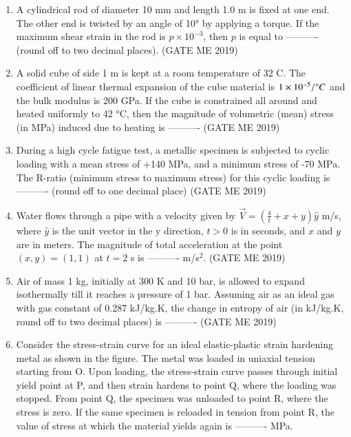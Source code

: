 \documentclass[journal]{IEEEtran}
\begin{document}
\begin{enumerate}
\item A cylindrical rod of diameter 10 mm and length 1.0 m is fixed at one end. The other end is twisted by an angle of 10° by applying a torque. If the maximum shear strain in the rod is $ p \times 10^{-3} $, then $ p $ is equal to ---------- (round off to two decimal places).
\hfill (GATE ME 2019)

\item A solid cube of side 1 m is kept at a room temperature of 32 \degree C. The coefficient of linear thermal expansion of the cube material is $ 1 \times 10^{-5} / \degree C $ and the bulk modulus is 200 GPa. If the cube is constrained all around and heated uniformly to 42 °C, then the magnitude of volumetric (mean) stress (in MPa) induced due to heating is ----------
\hfill (GATE ME 2019)

\item During a high cycle fatigue test, a metallic specimen is subjected to cyclic loading with a mean stress of +140 MPa, and a minimum stress of -70 MPa. The R-ratio (minimum stress to maximum stress) for this cyclic loading is ---------- (round off to one decimal place)
\hfill (GATE ME 2019)

\item Water flows through a pipe with a velocity given by $ \vec{V} = \left( \frac{4}{t} + x + y \right) \hat{y} $ m/s, where $ \hat{y} $ is the unit vector in the y direction, $ t > 0 $ is in seconds, and $ x $ and $ y $ are in meters. The magnitude of total acceleration at the point $ (x, y) = (1, 1) $ at $ t = 2 $ s is ---------- m/s$^2$.
\hfill (GATE ME 2019)

\item Air of mass 1 kg, initially at 300 K and 10 bar, is allowed to expand isothermally till it reaches a pressure of 1 bar. Assuming air as an ideal gas with gas constant of 0.287 kJ/kg.K, the change in entropy of air (in kJ/kg.K, round off to two decimal places) is ----------
\hfill (GATE ME 2019)

\item Consider the stress-strain curve for an ideal elastic-plastic strain hardening metal as shown in the figure. The metal was loaded in uniaxial tension starting from O. Upon loading, the stress-strain curve passes through initial yield point at P, and then strain hardens to point Q, where the loading was stopped. From point Q, the specimen was unloaded to point R, where the stress is zero. If the same specimen is reloaded in tension from point R, the value of stress at which the material yields again is ---------- MPa.


\end{enumerate}
\end{document}
